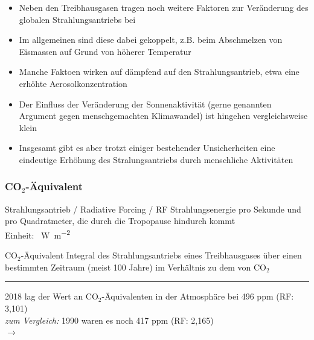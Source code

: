 \begin{frame}
{\begin{itemize}
    \item[] Neben den Treibhausgasen tragen noch weitere Faktoren zur Veränderung des globalen Strahlungsantriebs bei
    \item[] Im allgemeinen sind diese dabei gekoppelt, z.B. beim Abschmelzen von Eismassen auf Grund von höherer Temperatur
   	\item[] Manche Faktoen wirken auf dämpfend auf den Strahlungsantrieb, etwa eine erhöhte Aerosolkonzentration
   	\item[] Der Einfluss der Veränderung der Sonnenaktivität (gerne genannten Argument gegen menschgemachten Klimawandel) ist hingehen vergleichsweise klein
   	\item[] Insgesamt gibt es aber trotzt einiger bestehender Unsicherheiten eine eindeutige Erhöhung des Stralungsantriebs durch menschliche Aktivitäten
  \end{itemize}
  }
\end{frame}


\begin{frame}
	\frametitle{CO$_2$-Äquivalent}

	\begin{block}{Strahlungsantrieb / Radiative Forcing / RF}
		Strahlungsenergie pro Sekunde und pro Quadratmeter, die durch die Tropopause hindurch kommt \\
		Einheit: %
    \SI{}{\watt\per\square\meter}
	\end{block}

	\begin{block}{CO$_2$-Äquivalent}
		Integral des Strahlungsantriebs eines Treibhausgases über einen bestimmten Zeitraum (meist 100 Jahre) im Verhältnis zu dem von CO$_2$

	\end{block}


	\color{gray}\rule{\linewidth}{1pt}

	\color{black}

	2018 lag der Wert an CO$_2$-Äquivalenten in der Atmosphäre bei 496 ppm (RF: 3,101)\\
	\textit{zum Vergleich: } 1990 waren es noch 417 ppm (RF: 2,165)\\
	$\rightarrow$ \color{red}{Zuwachs des Strahlungsantriebs um 43 \% seit 1990}
\end{frame}

